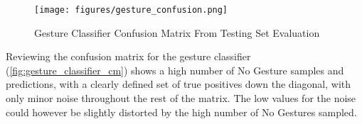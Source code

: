\begin{figure*}
    \centering
    \texttt{[image: figures/gesture\_confusion.png]}
    \caption{\label{fig:gesture_classifier_cm} Gesture Classifier Confusion Matrix From Testing Set Evaluation}
\end{figure*}
Reviewing the confusion matrix for the gesture classifier (\autoref{fig:gesture_classifier_cm}) shows a high number of No Gesture samples and predictions, with a clearly defined set of true positives down the diagonal, with only minor noise throughout the rest of the matrix. The low values for the noise could however be slightly distorted by the high number of No Gestures sampled.
